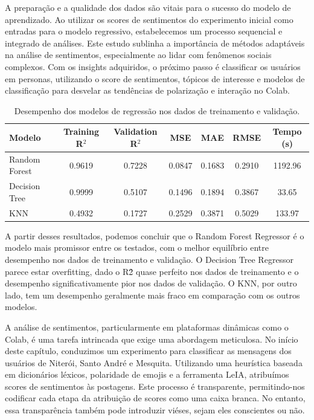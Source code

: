 A preparação e a qualidade dos dados são vitais para o sucesso do modelo de aprendizado. Ao utilizar os scores de sentimentos do experimento inicial como entradas para o modelo regressivo, estabelecemos um processo sequencial e integrado de análises. Este estudo sublinha a importância de métodos adaptáveis na análise de sentimentos, especialmente ao lidar com fenômenos sociais complexos. Com os insights adquiridos, o próximo passo é classificar os usuários em personas, utilizando o score de sentimentos, tópicos de interesse e modelos de classificação para desvelar as tendências de polarização e interação no Colab.

\begin{table}[h]
	\centering
	\begin{tabular}{|l|c|c|c|c|c|c|}
		\hline
		\textbf{Modelo} & \textbf{Training R$^2$} & \textbf{Validation R$^2$} & \textbf{MSE} & \textbf{MAE} & \textbf{RMSE} & \textbf{Tempo (s)} \\
		\hline
		Random Forest   & 0.9619                  & 0.7228                    & 0.0847       & 0.1683       & 0.2910        & 1192.96            \\
		\hline
		Decision Tree   & 0.9999                  & 0.5107                    & 0.1496       & 0.1894       & 0.3867        & 33.65              \\
		\hline
		KNN             & 0.4932                  & 0.1727                    & 0.2529       & 0.3871       & 0.5029        & 133.97             \\
		\hline
	\end{tabular}
	\caption{Desempenho dos modelos de regressão nos dados de treinamento e validação.}
	\label{tab:model_performance}
\end{table}	

A partir desses resultados, podemos concluir que o Random Forest Regressor é o modelo mais promissor entre os testados, com o melhor equilíbrio entre desempenho nos dados de treinamento e validação. O Decision Tree Regressor parece estar overfitting, dado o R\^2 quase perfeito nos dados de treinamento e o desempenho significativamente pior nos dados de validação. O KNN, por outro lado, tem um desempenho geralmente mais fraco em comparação com os outros modelos.

A análise de sentimentos, particularmente em plataformas dinâmicas como o Colab, é uma tarefa intrincada que exige uma abordagem meticulosa. No início deste capítulo, conduzimos um experimento para classificar as mensagens dos usuários de Niterói, Santo André e Mesquita. Utilizando uma heurística baseada em dicionários léxicos, polaridade de emojis e a ferramenta LeIA, atribuímos scores de sentimentos às postagens. Este processo é transparente, permitindo-nos codificar cada etapa da atribuição de scores como uma caixa branca. No entanto, essa transparência também pode introduzir viéses, sejam eles conscientes ou não.

